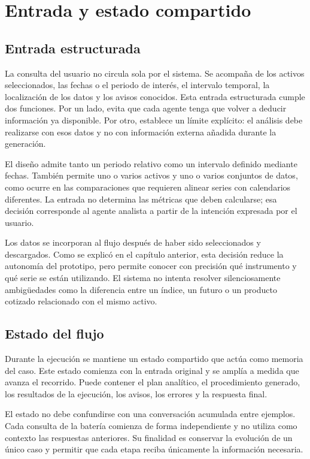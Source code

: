 \section{Entrada y estado compartido}

\subsection{Entrada estructurada}

La consulta del usuario no circula sola por el sistema. Se acompaña de los activos seleccionados, las fechas o el periodo de interés, el intervalo temporal, la localización de los datos y los avisos conocidos. Esta entrada estructurada cumple dos funciones. Por un lado, evita que cada agente tenga que volver a deducir información ya disponible. Por otro, establece un límite explícito: el análisis debe realizarse con esos datos y no con información externa añadida durante la generación.

El diseño admite tanto un periodo relativo como un intervalo definido mediante fechas. También permite uno o varios activos y uno o varios conjuntos de datos, como ocurre en las comparaciones que requieren alinear series con calendarios diferentes. La entrada no determina las métricas que deben calcularse; esa decisión corresponde al agente analista a partir de la intención expresada por el usuario.

Los datos se incorporan al flujo después de haber sido seleccionados y descargados. Como se explicó en el capítulo anterior, esta decisión reduce la autonomía del prototipo, pero permite conocer con precisión qué instrumento y qué serie se están utilizando. El sistema no intenta resolver silenciosamente ambigüedades como la diferencia entre un índice, un futuro o un producto cotizado relacionado con el mismo activo.

\subsection{Estado del flujo}

Durante la ejecución se mantiene un estado compartido que actúa como memoria del caso. Este estado comienza con la entrada original y se amplía a medida que avanza el recorrido. Puede contener el plan analítico, el procedimiento generado, los resultados de la ejecución, los avisos, los errores y la respuesta final.

El estado no debe confundirse con una conversación acumulada entre ejemplos. Cada consulta de la batería comienza de forma independiente y no utiliza como contexto las respuestas anteriores. Su finalidad es conservar la evolución de un único caso y permitir que cada etapa reciba únicamente la información necesaria.

